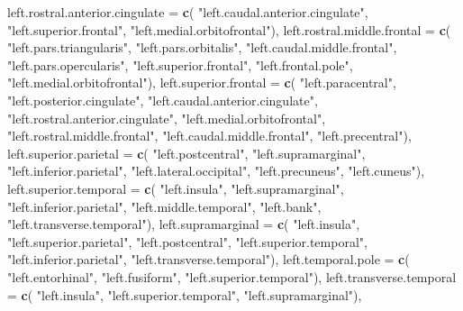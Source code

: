 \documentclass[
]{article}
\newenvironment{Shaded}{\begin{snugshade}}{\end{snugshade}}
\newcommand{\DataTypeTok}[1]{\textcolor[rgb]{0.13,0.29,0.53}{#1}}
\newcommand{\KeywordTok}[1]{\textcolor[rgb]{0.13,0.29,0.53}{\textbf{#1}}}
\newcommand{\NormalTok}[1]{#1}
\newcommand{\StringTok}[1]{\textcolor[rgb]{0.31,0.60,0.02}{#1}}
\begin{document}
\begin{Shaded}
\begin{Highlighting}[]
 \DataTypeTok{left.rostral.anterior.cingulate =} \KeywordTok{c}\NormalTok{(}
   \StringTok{"left.caudal.anterior.cingulate"}\NormalTok{, }\StringTok{"left.superior.frontal"}\NormalTok{, }
   \StringTok{"left.medial.orbitofrontal"}\NormalTok{),}
 \DataTypeTok{left.rostral.middle.frontal =} \KeywordTok{c}\NormalTok{(}
   \StringTok{"left.pars.triangularis"}\NormalTok{, }\StringTok{"left.pars.orbitalis"}\NormalTok{, }\StringTok{"left.caudal.middle.frontal"}\NormalTok{,}
   \StringTok{"left.pars.opercularis"}\NormalTok{, }\StringTok{"left.superior.frontal"}\NormalTok{, }\StringTok{"left.frontal.pole"}\NormalTok{,}
   \StringTok{"left.medial.orbitofrontal"}\NormalTok{),}
 \DataTypeTok{left.superior.frontal =} \KeywordTok{c}\NormalTok{(}
   \StringTok{"left.paracentral"}\NormalTok{, }\StringTok{"left.posterior.cingulate"}\NormalTok{, }\StringTok{"left.caudal.anterior.cingulate"}\NormalTok{,}
   \StringTok{"left.rostral.anterior.cingulate"}\NormalTok{, }\StringTok{"left.medial.orbitofrontal"}\NormalTok{,}
   \StringTok{"left.rostral.middle.frontal"}\NormalTok{, }\StringTok{"left.caudal.middle.frontal"}\NormalTok{, }\StringTok{"left.precentral"}\NormalTok{),}
 \DataTypeTok{left.superior.parietal =} \KeywordTok{c}\NormalTok{(}
   \StringTok{"left.postcentral"}\NormalTok{, }\StringTok{"left.supramarginal"}\NormalTok{, }\StringTok{"left.inferior.parietal"}\NormalTok{,}
   \StringTok{"left.lateral.occipital"}\NormalTok{, }\StringTok{"left.precuneus"}\NormalTok{, }\StringTok{"left.cuneus"}\NormalTok{),}
 \DataTypeTok{left.superior.temporal =} \KeywordTok{c}\NormalTok{(}
   \StringTok{"left.insula"}\NormalTok{, }\StringTok{"left.supramarginal"}\NormalTok{,  }\StringTok{"left.inferior.parietal"}\NormalTok{,}
   \StringTok{"left.middle.temporal"}\NormalTok{, }\StringTok{"left.bank"}\NormalTok{, }\StringTok{"left.transverse.temporal"}\NormalTok{),}
 \DataTypeTok{left.supramarginal =} \KeywordTok{c}\NormalTok{(}
   \StringTok{"left.insula"}\NormalTok{, }\StringTok{"left.superior.parietal"}\NormalTok{, }\StringTok{"left.postcentral"}\NormalTok{,}
   \StringTok{"left.superior.temporal"}\NormalTok{, }\StringTok{"left.inferior.parietal"}\NormalTok{, }\StringTok{"left.transverse.temporal"}\NormalTok{),}
 \DataTypeTok{left.temporal.pole =} \KeywordTok{c}\NormalTok{(}
   \StringTok{"left.entorhinal"}\NormalTok{, }\StringTok{"left.fusiform"}\NormalTok{, }\StringTok{"left.superior.temporal"}\NormalTok{),}
 \DataTypeTok{left.transverse.temporal =} \KeywordTok{c}\NormalTok{(}
   \StringTok{"left.insula"}\NormalTok{, }\StringTok{"left.superior.temporal"}\NormalTok{, }\StringTok{"left.supramarginal"}\NormalTok{),}

\end{Highlighting}
\end{Shaded}
\end{document}
